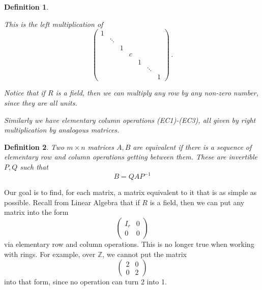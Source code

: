 \documentclass{article}
\theoremstyle{plain}\theoremheaderfont{\normalfont\itshape}\theorembodyfont{\rmfamily}\theoremseparator{.}\newtheorem*{rem}{Remark}\newtheorem*{ex}{Example}\newtheorem*{proof}{Proof}\newtheorem*{altp}{Alternative proof}\newtheorem*{nonex}{Non-Example}
\theoremstyle{plain}\theoremheaderfont{\normalfont\bfseries}\theorembodyfont{\rmfamily}\theoremseparator{.}\newtheorem{thm}{Theorem}[section]\newtheorem{lem}[thm]{Lemma}\newtheorem{prop}[thm]{Proposition}\newtheorem*{cor}{Corollary}\newtheorem{defn}[thm]{Definition}\newtheorem{clm}[thm]{Claim}\newtheorem{clminproof}{Claim}\newtheorem*{notn}{Notation}\newtheorem*{exer}{Exercise}\newtheorem*{lemnn}{Lemma}
\theoremstyle{break}\theoremheaderfont{\normalfont\itshape}\theorembodyfont{\rmfamily}\theoremseparator{.\medskip}\newtheorem*{proofskip}{Proof}\newtheorem*{exs}{Examples}\newtheorem*{rems}{Remarks}\newtheorem*{obs}{Observations}
\theoremstyle{break}\theoremheaderfont{\normalfont\bfseries}\theorembodyfont{\rmfamily}\theoremseparator{.\medskip}\newtheorem{lemskip}[thm]{Lemma}\newtheorem{defnskip}[thm]{Definition}\newtheorem{propskip}[thm]{Proposition}\newtheorem{thmskip}[thm]{Theorem}
\numberwithin{equation}{section}
\newcommand{\ZZ}{\mathbb{Z}}
\begin{document}
\begin{defn}
\begin{enumerate}[topsep=0pt,leftmargin=35pt]
            This is the left multiplication of
            \[\begin{pmatrix}
                1 \\
                & \ddots\\
                & & 1 \\
                & & & c\\
                & & & & 1\\
                & & & & & \ddots\\
                & & & & & & 1
            \end{pmatrix}\,.\]

            Notice that if $R$ is a field, then we can multiply any row by any non-zero number, since they are all units.
        \end{enumerate}

        Similarly we have \textit{elementary column operations} (EC1)-(EC3), all given by right multiplication by analogous matrices.
    \end{defn}
    \begin{defn}
        Two \(m\times n\) matrices \(A,B\) are \textit{equivalent} if there is a sequence of elementary row and column operations getting between them. These are invertible \(P,Q\) such that
        \[B=QAP^{-1}\]
    \end{defn}

    Our goal is to find, for each matrix, a matrix equivalent to it that is as simple as possible. Recall from Linear Algebra that if \(R\) is a field, then we can put any matrix into the form
    \[\begin{pmatrix}
        I_r & 0 \\
        0 & 0
    \end{pmatrix}\]
    via elementary row and column operations. This is no longer true when working with rings. For example, over \(\ZZ\), we cannot put the matrix
    \[\begin{pmatrix}
        2 & 0\\
        0 & 2
    \end{pmatrix}\]
    into that form, since no operation can turn 2 into 1.
\end{document}
